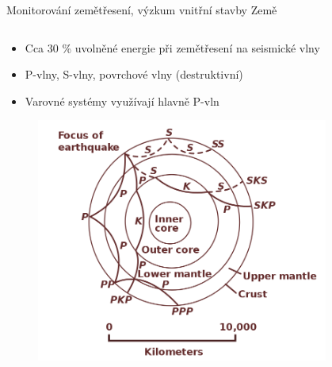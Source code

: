 \documentclass[10pt, frame]{beamer}
\begin{document}
\begin{frame}{Monitorování zemětřesení, výzkum vnitřní stavby Země}
    \begin{columns}
        \begin{column}{0.6\textwidth}
            \begin{itemize}
                \item Cca 30 \% uvolněné energie při zemětřesení na seismické vlny
                \item P-vlny, S-vlny, povrchové vlny (destruktivní)
                \item Varovné systémy využívají hlavně P-vln
            \end{itemize}
            \begin{figure}[h]
                \includegraphics[width=.65\textwidth]{wave_path.png}
            \end{figure}
        \end{column}
        \begin{column}{0.4\textwidth}
            \begin{figure}

\end{figure}
\end{column}
\end{columns}
\end{frame}
\end{document}
